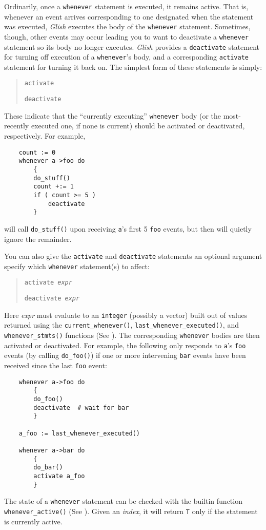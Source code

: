 Ordinarily, once a {\tt whenever} statement is executed, it remains active.  That is, whenever an event arrives corresponding to one
designated when the statement was executed, {\em Glish} 
executes the body of
the {\tt whenever} statement.  Sometimes, though, other events may occur
leading you to want to deactivate a {\tt whenever} statement so its body
no longer executes.  {\em Glish} provides a {\tt deactivate} statement for
turning off execution of a {\tt whenever}'s body, and a corresponding
{\tt activate} statement for turning it back on.  The simplest form of
these statements is simply:
\begin{quote}
    {\tt activate }

    {\tt deactivate }
\end{quote}
These indicate that the ``currently executing'' {\tt whenever} body (or the
most-recently executed one, if none is current) should be activated or
deactivated, respectively. For example,
\begin{verbatim}
    count := 0
    whenever a->foo do
        {
        do_stuff()
        count +:= 1
        if ( count >= 5 )
            deactivate
        }
\end{verbatim}
will call {\tt do\_stuff()} upon receiving {\tt a}'s first 5 {\tt foo}
events, but then will quietly ignore the remainder.

You can also give the {\tt activate} and {\tt deactivate} statements an
optional argument specify which {\tt whenever} statement(s) to affect:
\begin{quote}
    {\tt activate {\em expr}}

    {\tt deactivate {\em expr}}
\end{quote}
Here {\em expr} must evaluate to an {\tt integer} (possibly a vector)
built out of values returned using the
{\tt current\_whenever()}, {\tt last\_whenever\_executed()},
and {\tt whenever\_stmts()} functions (See ).
The corresponding {\tt whenever} bodies are then activated or
deactivated.  For example, the following only responds to
{\tt a}'s {\tt foo} events (by calling \verb+do_foo()+) if one or
more intervening {\tt bar} events have been received since the last
{\tt foo} event:
\begin{verbatim}
    whenever a->foo do
        {
        do_foo()
        deactivate  # wait for bar
        }

    a_foo := last_whenever_executed()

    whenever a->bar do
        {
        do_bar()
        activate a_foo
        }
\end{verbatim}
The state of a {\tt whenever} statement can be checked with the builtin
function {\tt whenever\_active()} (See ). Given
an {\em index}, it will return {\tt T} only if the statement is currently
active.

